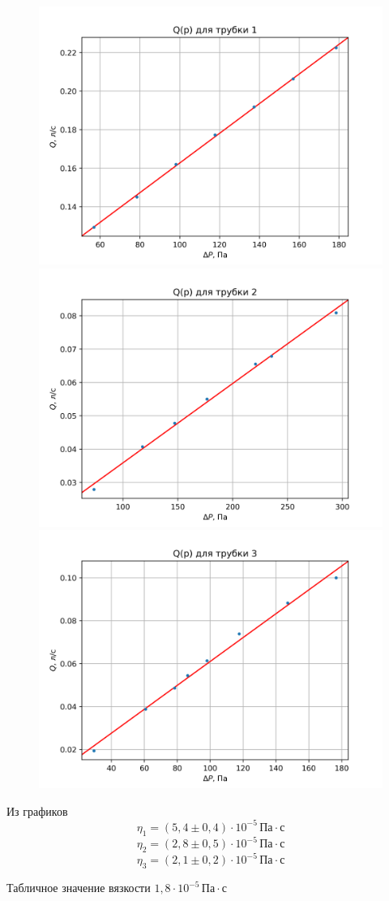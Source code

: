 \begin{figure}[ht!]
    \centering\includegraphics[width=0.6\linewidth]{img/data01.png}
    \centering\includegraphics[width=0.6\linewidth]{img/data02.png}
    \centering\includegraphics[width=0.6\linewidth]{img/data03.png}
\end{figure}

Из графиков
\[\eta_1 = \left(5{,}4\pm 0{,}4\right)\cdot 10^{-5}\,\text{Па}\cdot\text{с}\]
\[\eta_2 = \left(2{,}8\pm 0{,}5\right)\cdot 10^{-5}\,\text{Па}\cdot\text{с}\]
\[\eta_3 = \left(2{,}1\pm 0{,}2\right)\cdot 10^{-5}\,\text{Па}\cdot\text{с}\]

Табличное значение вязкости $1{,}8\cdot 10^{-5}\,\text{Па}\cdot\text{с}$

